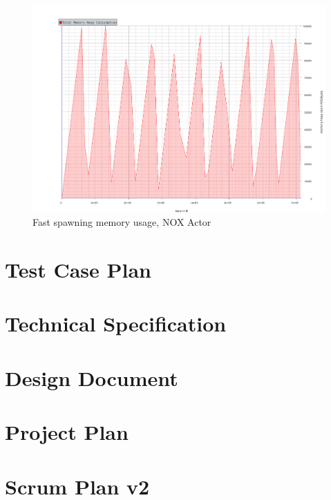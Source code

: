 \documentclass[BSP,english,oneside]{ntnuthesis/ntnubachelorthesis}
\begin{document}
\begin{figure}
    \includegraphics[scale=0.5]{benchmark_results/fast_spawn/nox_massif_deletes_10.pdf}
    \caption{Fast spawning memory usage, NOX Actor}
    \label{fig:fast_spawning_memory_usage_nox_actor}
\end{figure}

\iffalse
\chapter{Test Case Plan}
\label{chap:appendix_test_case_plan}


\chapter{Technical Specification}
\label{chap:appendix_technical_specification}


\chapter{Design Document}
\label{chap:appendix_design_document}


\chapter{Project Plan}
\label{chap:appendix_project_plan}


\chapter{Scrum Plan v2}
\label{chap:appendix_scrum_plan_v2}

\end{document}
